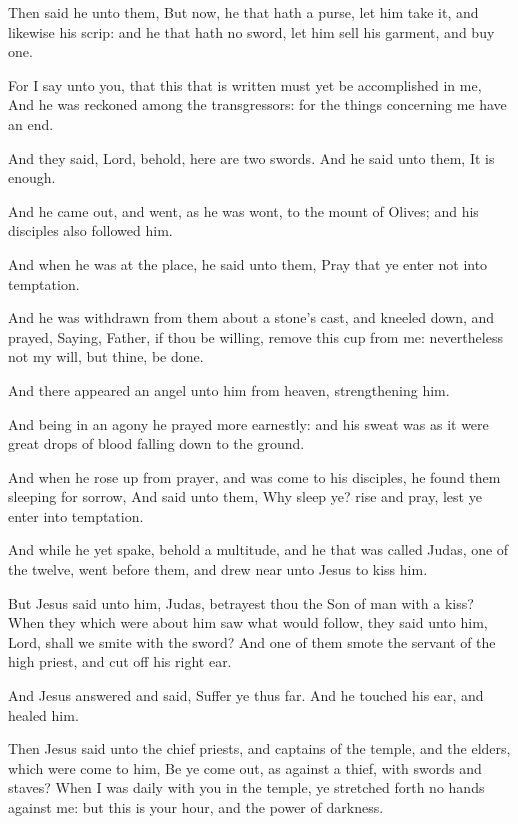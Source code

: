 \Verse Then said he unto them, But now, he that hath a purse, let him take it, and likewise his scrip: and he that hath no sword, let him sell his garment, and buy one.

\Verse For I say unto you, that this that is written must yet be accomplished in me, And he was reckoned among the transgressors: for the things concerning me have an end.

\Verse And they said, Lord, behold, here are two swords. And he said unto them, It is enough.

\Verse And he came out, and went, as he was wont, to the mount of Olives; and his disciples also followed him.

\Verse And when he was at the place, he said unto them, Pray that ye enter not into temptation.

\Verse And he was withdrawn from them about a stone's cast, and kneeled down, and prayed, \Verse Saying, Father, if thou be willing, remove this cup from me: nevertheless not my will, but thine, be done.

\Verse And there appeared an angel unto him from heaven, strengthening him.

\Verse And being in an agony he prayed more earnestly: and his sweat was as it were great drops of blood falling down to the ground.

\Verse And when he rose up from prayer, and was come to his disciples, he found them sleeping for sorrow, \Verse And said unto them, Why sleep ye? rise and pray, lest ye enter into temptation.

\Verse And while he yet spake, behold a multitude, and he that was called Judas, one of the twelve, went before them, and drew near unto Jesus to kiss him.

\Verse But Jesus said unto him, Judas, betrayest thou the Son of man with a kiss?  \Verse When they which were about him saw what would follow, they said unto him, Lord, shall we smite with the sword?  \Verse And one of them smote the servant of the high priest, and cut off his right ear.

\Verse And Jesus answered and said, Suffer ye thus far. And he touched his ear, and healed him.

\Verse Then Jesus said unto the chief priests, and captains of the temple, and the elders, which were come to him, Be ye come out, as against a thief, with swords and staves?  \Verse When I was daily with you in the temple, ye stretched forth no hands against me: but this is your hour, and the power of darkness.


